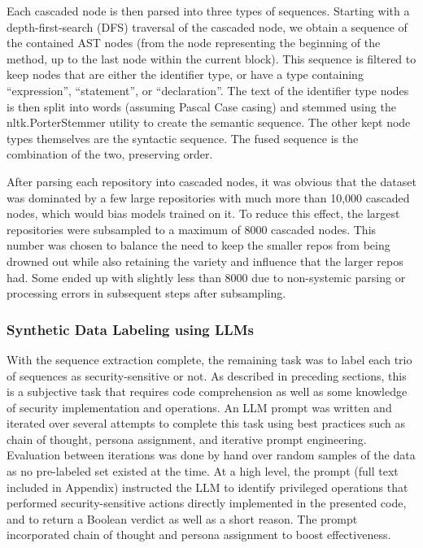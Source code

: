 \documentclass[11pt]{article}
\begin{document}
Each cascaded node is then parsed into three types of sequences.
Starting with a depth-first-search (DFS) traversal of the cascaded node,
we obtain a sequence of the contained AST nodes (from the node
representing the beginning of the method, up to the last node within the
current block). This sequence is filtered to keep nodes that are either
the identifier type, or have a type containing ``expression'',
``statement'', or ``declaration''. The text of the identifier type nodes
is then split into words (assuming Pascal Case casing) and stemmed using
the nltk.PorterStemmer utility to create the semantic sequence. The
other kept node types themselves are the syntactic sequence. The fused
sequence is the combination of the two, preserving order.

After parsing each repository into cascaded nodes, it was obvious that
the dataset was dominated by a few large repositories with much more
than 10,000 cascaded nodes, which would bias models trained on it. To
reduce this effect, the largest repositories were subsampled to a
maximum of 8000 cascaded nodes. This number was chosen to balance the
need to keep the smaller repos from being drowned out while also
retaining the variety and influence that the larger repos had. Some
ended up with slightly less than 8000 due to non-systemic parsing or
processing errors in subsequent steps after subsampling.

\subsubsection{Synthetic Data Labeling using LLMs}\label{synthetic-data-labeling-using-llms}

With the sequence extraction complete, the remaining task was to label
each trio of sequences as security-sensitive or not. As described in
preceding sections, this is a subjective task that requires code
comprehension as well as some knowledge of security implementation and
operations. An LLM prompt was written and iterated over several attempts
to complete this task using best practices such as chain of thought,
persona assignment, and iterative prompt engineering. Evaluation between
iterations was done by hand over random samples of the data as no
pre-labeled set existed at the time. At a high level, the prompt (full
text included in Appendix) instructed the LLM to identify privileged
operations that performed security-sensitive actions directly
implemented in the presented code, and to return a Boolean verdict as
well as a short reason. The prompt incorporated chain of thought and
persona assignment to boost effectiveness.
\end{document}
